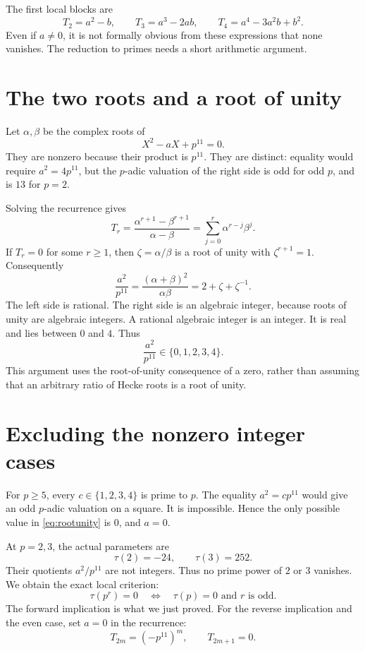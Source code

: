The first local blocks are
\[
T_2=a^2-b,\qquad T_3=a^3-2ab,\qquad
T_4=a^4-3a^2b+b^2.
\]
Even if $a\ne0$, it is not formally obvious from these expressions that none vanishes. The reduction to primes needs a short arithmetic argument.

\section{The two roots and a root of unity}
Let $\alpha,\beta$ be the complex roots of
\[
X^2-aX+p^{11}=0.
\]
They are nonzero because their product is $p^{11}$. They are distinct: equality would require $a^2=4p^{11}$, but the $p$-adic valuation of the right side is odd for odd $p$, and is $13$ for $p=2$.

Solving the recurrence gives
\begin{equation}\label{eq:rootrec}
T_r=\frac{\alpha^{r+1}-\beta^{r+1}}{\alpha-\beta}
=\sum_{j=0}^r\alpha^{r-j}\beta^j.
\end{equation}
If $T_r=0$ for some $r\ge1$, then $\zeta=\alpha/\beta$ is a root of unity with $\zeta^{r+1}=1$. Consequently
\begin{equation}\label{eq:rootunity}
\frac{a^2}{p^{11}}
=\frac{(\alpha+\beta)^2}{\alpha\beta}
=2+\zeta+\zeta^{-1}.
\end{equation}
The left side is rational. The right side is an algebraic integer, because roots of unity are algebraic integers. A rational algebraic integer is an integer. It is real and lies between $0$ and $4$. Thus
\[
\frac{a^2}{p^{11}}\in\{0,1,2,3,4\}.
\]
This argument uses the root-of-unity consequence of a zero, rather than assuming that an arbitrary ratio of Hecke roots is a root of unity.

\section{Excluding the nonzero integer cases}
For $p\ge5$, every $c\in\{1,2,3,4\}$ is prime to $p$. The equality $a^2=cp^{11}$ would give an odd $p$-adic valuation on a square. It is impossible. Hence the only possible value in \eqref{eq:rootunity} is $0$, and $a=0$.

At $p=2,3$, the actual parameters are
\[
\tau(2)=-24,\qquad\tau(3)=252.
\]
Their quotients $a^2/p^{11}$ are not integers. Thus no prime power of $2$ or $3$ vanishes. We obtain the exact local criterion:
\begin{equation}\label{eq:tzero}
\tau(p^r)=0\quad\Longleftrightarrow\quad
\tau(p)=0\text{ and }r\text{ is odd}.
\end{equation}
The forward implication is what we just proved. For the reverse implication and the even case, set $a=0$ in the recurrence:
\[
T_{2m}=(-p^{11})^m,\qquad T_{2m+1}=0.
\]

